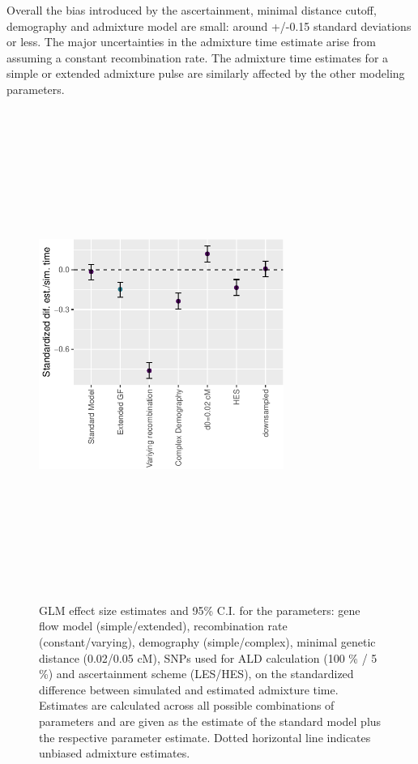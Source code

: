\documentclass[11pt]{article}
\begin{document}
Overall the bias introduced by the ascertainment, minimal distance
cutoff, demography and admixture model are small: around +/-0.15 standard deviations or less. The major uncertainties in the admixture time
estimate arise from assuming a constant recombination rate. The
admixture time estimates for a simple or extended admixture pulse are similarly affected by the other modeling parameters.

\begin{figure}
\centering
\includegraphics[width=8cm,height=16cm,keepaspectratio]{ATE_Revisions_files/figure-latex/figResult_3-1.pdf}
\caption{\label{fig:fig3} GLM effect size estimates and 95\% C.I. for the parameters: gene flow model (simple/extended), recombination rate (constant/varying), demography (simple/complex), minimal genetic distance (0.02/0.05 cM), SNPs used for ALD calculation (100 \% / 5 \%) and ascertainment scheme (LES/HES), on the standardized difference between simulated and estimated admixture time. Estimates are calculated across all possible combinations of parameters and are given as the estimate of the standard model plus the respective parameter estimate. Dotted horizontal line indicates unbiased admixture estimates.}
\end{figure}
\end{document}
